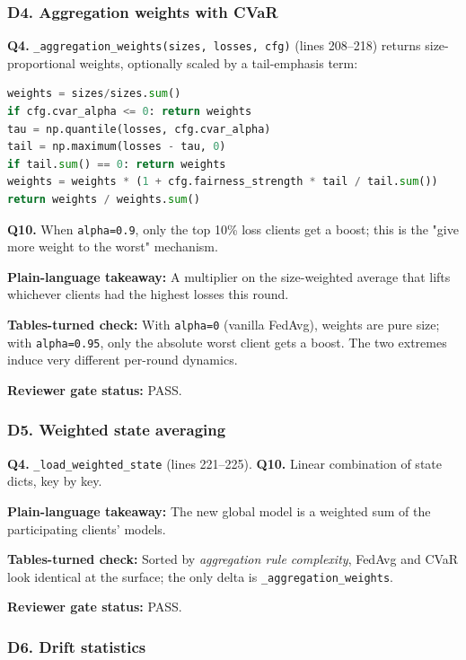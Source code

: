 \documentclass{article}
\begin{document}
\subsubsection{D4. Aggregation weights with CVaR}


\textbf{Q4.} \texttt{\_aggregation\_weights(sizes, losses, cfg)} (lines 208--218) returns size-proportional weights, optionally scaled by a tail-emphasis term:


\begin{lstlisting}[language=Python]
weights = sizes/sizes.sum()
if cfg.cvar_alpha <= 0: return weights
tau = np.quantile(losses, cfg.cvar_alpha)
tail = np.maximum(losses - tau, 0)
if tail.sum() == 0: return weights
weights = weights * (1 + cfg.fairness_strength * tail / tail.sum())
return weights / weights.sum()
\end{lstlisting}


\textbf{Q10.} When \texttt{alpha=0.9}, only the top 10\% loss clients get a boost; this is the "give more weight to the worst" mechanism.


\textbf{Plain-language takeaway:} A multiplier on the size-weighted average that lifts whichever clients had the highest losses this round.


\textbf{Tables-turned check:} With \texttt{alpha=0} (vanilla FedAvg), weights are pure size; with \texttt{alpha=0.95}, only the absolute worst client gets a boost. The two extremes induce very different per-round dynamics.


\textbf{Reviewer gate status:} PASS.


\subsubsection{D5. Weighted state averaging}


\textbf{Q4.} \texttt{\_load\_weighted\_state} (lines 221--225). \textbf{Q10.} Linear combination of state dicts, key by key.


\textbf{Plain-language takeaway:} The new global model is a weighted sum of the participating clients' models.


\textbf{Tables-turned check:} Sorted by \emph{aggregation rule complexity}, FedAvg and CVaR look identical at the surface; the only delta is \texttt{\_aggregation\_weights}.


\textbf{Reviewer gate status:} PASS.


\subsubsection{D6. Drift statistics}
\end{document}
